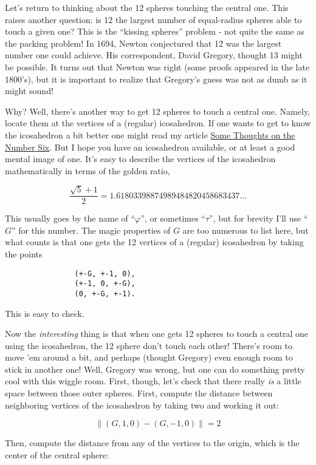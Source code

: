 \documentclass{article}
\begin{document}
Let's return to thinking about the 12 spheres touching the central one.
This raises another question: is 12 the largest number of equal-radius
spheres able to touch a given one? This is the ``kissing spheres''
problem - not quite the same as the packing problem! In 1694, Newton
conjectured that 12 was the largest number one could achieve. His
correspondent, David Gregory, thought 13 might be possible. It turns out
that Newton was right (some proofs appeared in the late 1800's), but it
is important to realize that Gregory's guess was not as dumb as it might
sound!

Why? Well, there's another way to get 12 spheres to touch a central one.
Namely, locate them at the vertices of a (regular) icosahedron. If one
wants to get to know the icosahedron a bit better one might read my
article \href{http://math.ucr.edu/home/baez/six.html}{Some Thoughts on
the Number Six}. But I hope you have an icosahedron available, or at
least a good mental image of one. It's easy to describe the vertices of
the icosahedron mathematically in terms of the golden ratio,

\[\frac{\sqrt{5} + 1}{2} = 1.61803398874989484820458683437\ldots\]

This usually goes by the name of ``\(\varphi\)'', or sometimes
``\(\tau\)'', but for brevity I'll use ``\(G\)'' for this number. The
magic properties of \(G\) are too numerous to list here, but what counts
is that one gets the 12 vertices of a (regular) icosahedron by taking
the points

\begin{verbatim}
                (+-G, +-1, 0),
                (+-1, 0, +-G),
                (0, +-G, +-1).
\end{verbatim}

This is easy to check.

Now the \emph{interesting} thing is that when one gets 12 spheres to
touch a central one using the icosahedron, the 12 sphere don't touch
each other! There's room to move 'em around a bit, and perhaps (thought
Gregory) even enough room to stick in another one! Well, Gregory was
wrong, but one can do something pretty cool with this wiggle room.
First, though, let's check that there really \emph{is} a little space
between those outer spheres. First, compute the distance between
neighboring vertices of the icosahedron by taking two and working it
out:

\[\|(G,1,0) - (G,-1,0)\| = 2\]

Then, compute the distance from any of the vertices to the origin, which
is the center of the central sphere:
\end{document}
